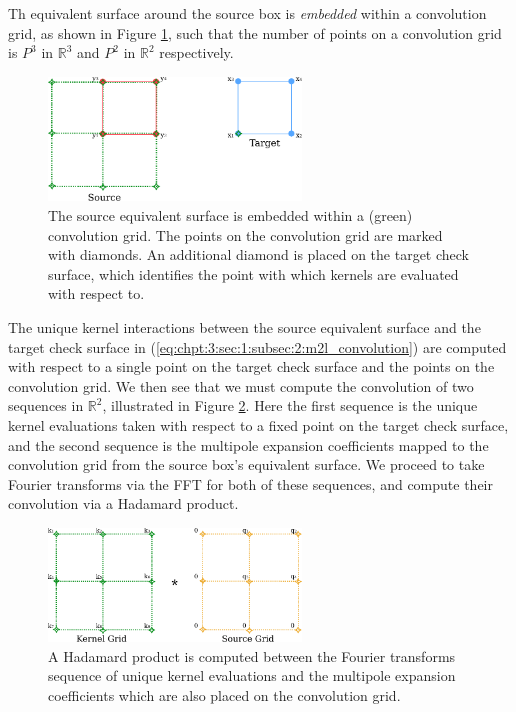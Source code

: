 Th equivalent surface around the source box is \textit{embedded} within a convolution grid, as shown in Figure \ref{fig:chpt:3:sec:1:subsec:2:embed_surface_grid}, such that the number of points on a convolution grid is $P^3$ in $\mathbb{R}^3$ and $P^2$ in $\mathbb{R}^2$ respectively.

\begin{figure}
    \centering
    \includegraphics[width=0.6\textwidth]{images/ch_3/embed_surface_grid.pdf}
    \caption{The source equivalent surface is embedded within a (green) convolution grid. The points on the convolution grid are marked with diamonds. An additional diamond is placed on the target check surface, which identifies the point with which kernels are evaluated with respect to.}
    \label{fig:chpt:3:sec:1:subsec:2:embed_surface_grid}
\end{figure}

The unique kernel interactions between the source equivalent surface and the target check surface in (\ref{eq:chpt:3:sec:1:subsec:2:m2l_convolution}) are computed with respect to a single point on the target check surface and the points on the convolution grid. We then see that we must compute the convolution of two sequences in $\mathbb{R}^2$, illustrated in Figure \ref{fig:chpt:3:sec:1:subsec:2:convolution}. Here the first sequence is the unique kernel evaluations taken with respect to a fixed point on the target check surface, and the second sequence is the multipole expansion coefficients mapped to the convolution grid from the source box's equivalent surface. We proceed to take Fourier transforms via the FFT for both of these sequences, and compute their convolution via a Hadamard product.

\begin{figure}
    \centering
    \includegraphics[width=0.6\textwidth]{images/ch_3/convolution.pdf}
    \caption{A Hadamard product is computed between the Fourier transforms sequence of unique kernel evaluations and the multipole expansion coefficients which are also placed on the convolution grid.}
    \label{fig:chpt:3:sec:1:subsec:2:convolution}
\end{figure}

